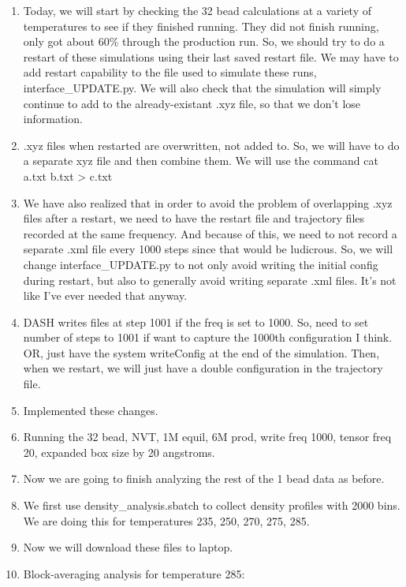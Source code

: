 \documentclass[12pt,reqno]{amsart}
\numberwithin{equation}{section}
\begin{document}
\begin{enumerate}
\item Today, we will start by checking the 32 bead calculations at a variety of temperatures to see if they finished running.  They did not finish running, only got about 60\% through the production run.  So, we should try to do a restart of these simulations using their last saved restart file.  We may have to add restart capability to the file used to simulate these runs, interface\_UPDATE.py.  We will also check that the simulation will simply continue to add to the already-existant .xyz file, so that we don't lose information. 
\item .xyz files when restarted are overwritten, not added to.  So, we will have to do a separate xyz file and then combine them.  We will use the command cat a.txt b.txt > c.txt
\item We have also realized that in order to avoid the problem of overlapping .xyz files after a restart, we need to have the restart file and trajectory files recorded at the same frequency.  And because of this, we need to not record a separate .xml file every 1000 steps since that would be ludicrous.  So, we will change interface\_UPDATE.py to not only avoid writing the initial config during restart, but also to generally avoid writing separate .xml files.  It's not like I've ever needed that anyway.  
\item DASH writes files at step 1001 if the freq is set to 1000.  So, need to set number of steps to 1001 if want to capture the 1000th configuration I think.  OR, just have the system writeConfig at the end of the simulation.  Then, when we restart, we will just have a double configuration in the trajectory file. 
\item Implemented these changes. 
\item Running the 32 bead, NVT, 1M equil, 6M prod, write freq 1000, tensor freq 20, expanded box size by 20 angstroms.  
\item Now we are going to finish analyzing the rest of the 1 bead data as before.  
\item We first use density\_analysis.sbatch to collect density profiles with 2000 bins.  We are doing this for temperatures 235, 250, 270, 275, 285.  
\item Now we will download these files to laptop.   
\item Block-averaging analysis for temperature 285:
\begin{figure}[H]
\centering

\end{figure}
\end{enumerate}
\end{document}
